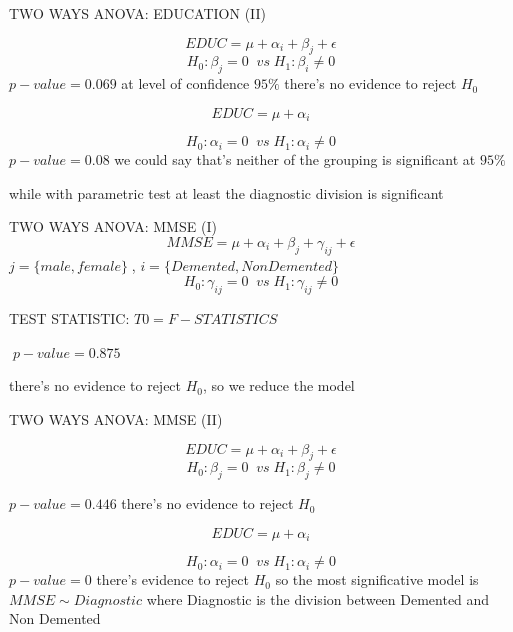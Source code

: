 \documentclass{beamer}
\begin{document}
\begin{frame}{TWO WAYS ANOVA: EDUCATION (II)}

	$$ EDUC =  \mu + \alpha_i + \beta_j  + \epsilon $$
	$$
	H_0: \beta_j=0\; \;vs\;H_1:\beta_i\neq0 
	$$
	$p-value = 0.069$
	at level of confidence $ 95\% $ there's no evidence to	reject $H_0$ 
	
	$$ EDUC =  \mu + \alpha_i  $$
	
		$$
	H_0:\alpha_i=0\; \;vs\;H_1:\alpha_i\neq0
	$$
	$p-value = 0.08 $
we could say that's neither of the grouping is significant at $95\%$ 

while with parametric test at least the diagnostic division is significant
\end{frame}
	\begin{frame}{ TWO WAYS ANOVA: MMSE (I)}
	$$ MMSE =   \mu + \alpha_i + \beta_j + \gamma_{ij} + \epsilon $$
		$ j =\{male,female\} \;$,
	$ i=\{ Demented, Non Demented \}$
	$$
	H_0: \gamma_{ij}=0\; \;vs\;H_1:\gamma_{ij}\neq0 
	$$
	
	TEST STATISTIC: $ T0= F-STATISTICS \;$
	
	$\; p-value = 0.875 $
	
	there's no evidence to	reject $H_0$,  
	so we reduce the model
	
	
\end{frame}

\begin{frame}{TWO WAYS ANOVA: MMSE (II)}

	$$ EDUC =   \mu + \alpha_i + \beta_j  + \epsilon  $$
	$$
	H_0:\beta_j=0\; \;vs\;H_1:\beta_j\neq0 
	$$
	
	$p-value = 0.446$
	there's no evidence to reject $H_0$
	
	$$ EDUC =  \mu + \alpha_i $$
	
	$$
	H_0: \alpha_i =0\; \;vs\;H_1:\alpha_i \neq0 
	$$
	$p-value = 0$
	there's evidence to reject $H_0 $ 
	so the most significative model is $ MMSE \sim Diagnostic$
	where Diagnostic is the division between Demented and Non Demented
	\end{frame}
\end{document}
